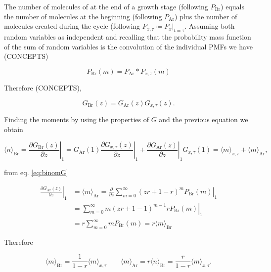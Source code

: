 The number of molecules of at the end of a growth stage (following $P_\text{Br}$) equals the number of molecules at the beginning (following $P_\text{Ar}$) plus the number of molecules created during the cycle (following $P_{x,\tau} \coloneqq P_x|_{t=\tau}$. Assuming both random variables as independent and recalling that the probability mass function of the sum of random variables is the convolution of the individual PMFs we have (CONCEPTS)

\begin{equation*}
  P_\text{Br}(m) = P_\text{Ar}\ast P_{x,\tau}(m)
\end{equation*}

Therefore (CONCEPTS),

\begin{equation}
  G_\text{Br}(z) = G_\text{Ar}(z)G_{x,\tau}(z).
\end{equation}

Finding the moments by using the properties of $G$ and the previous equation we obtain

\begin{equation*}
  \langle n\rangle_\text{Br} = \left.\frac{\partial G_\text{Br}(z)}{\partial z}\right|_1 = G_\text{Ar}(1)\left.\frac{\partial G_{x,\tau}(z)}{\partial z}\right|_1 + \left.\frac{\partial G_\text{Ar}(z)}{\partial z}\right|_1G_{x,\tau}(1) = \langle m\rangle_{x,\tau} + \langle m\rangle_\text{Ar},
\end{equation*}

from eq. \ref{eq:binomG} 

\begin{equation*}
  \begin{split}
  \left.\frac{\partial G_\text{Ar}(z)}{\partial z}\right|_1 &= \langle m\rangle_\text{Ar} = \left.\frac{\partial}{\partial z} \sum_{m=0}^\infty(zr+1-r)^mP_\text{Br}(m)\right|_1\\
&= \left.\sum_{m=0}^\infty m(zr+1-1)^{m-1}rP_\text{Br}(m)\right|_1\\
&= r\sum_{m=0}^\infty mP_\text{Br}(m) = r\langle m\rangle_\text{Br}
  \end{split}
\end{equation*}
  
Therefore

\begin{equation}
  \label{eq:aveBrAr}
  \langle m\rangle_\text{Br} = \frac{1}{1-r}\langle m\rangle_{x,\tau}\quad\quad \langle m\rangle_\text{Ar} = r\langle n\rangle_\text{Br} = \frac{r}{1-r}\langle m\rangle_{x,\tau}.
\end{equation}

